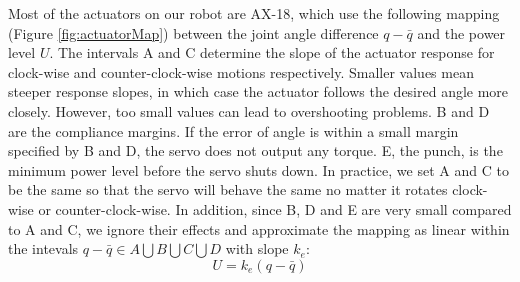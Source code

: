 Most of the actuators on our robot are AX-18, which use the following mapping (Figure \ref{fig:actuatorMap}) between the joint angle difference $q-\bar{q}$ and the power level $U$. The intervals A and C determine the slope of the actuator response for clock-wise and counter-clock-wise motions respectively. Smaller values mean steeper response slopes, in which case the actuator follows the desired angle more closely. However, too small values can lead to overshooting problems. B and D are the compliance margins. If the error of angle is within a small margin specified by B and D, the servo does not output any torque. E, the punch, is the minimum power level before the servo shuts down. In practice, we set A and C to be the same so that the servo will behave the same no matter it rotates clock-wise or counter-clock-wise. In addition, since B, D and E are very small compared to A and C, we ignore their effects and approximate the mapping as linear within the intevals $q-\bar{q}\in A\bigcup B\bigcup C\bigcup D$ with slope $k_e$:
\begin{equation}
  U=k_e(q-\bar{q})
  \label{eqn:voltageErrorRelation}
\end{equation}

